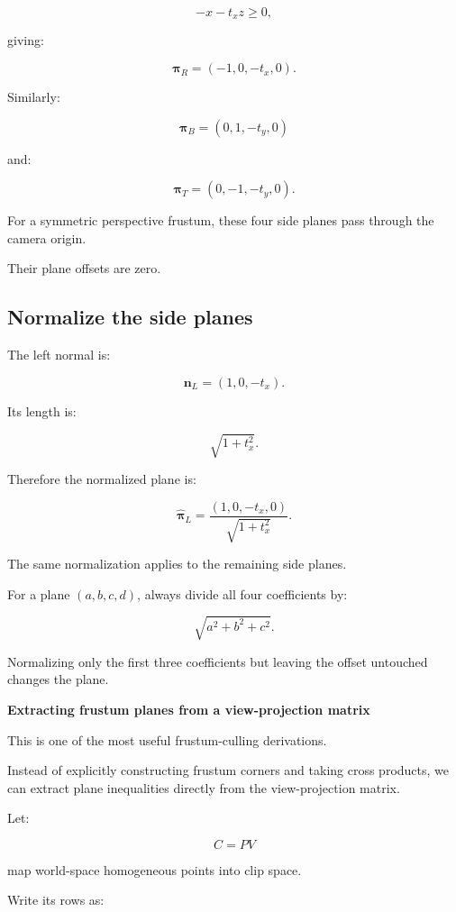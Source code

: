 \[
 \boxed{-x-t_xz\ge0},
\]

giving:

\[
 \boxed{ \boldsymbol\pi_R=(-1,0,-t_x,0) }.
\]

Similarly:

\[
 \boxed{ \boldsymbol\pi_B=(0,1,-t_y,0) }
\]

and:

\[
 \boxed{ \boldsymbol\pi_T=(0,-1,-t_y,0) }.
\]

For a symmetric perspective frustum, these four side planes pass through the camera origin.

Their plane offsets are zero.

\subsection{Normalize the side planes}\label{02-foundations-ii-ch034-normalize-the-side-planes}

\hypertarget{02-foundations-ii-ch034-normalize-the-side-planes}{}

The left normal is:

\[
 \mathbf n_L=(1,0,-t_x).
\]

Its length is:

\[
 \sqrt{1+t_x^2}.
\]

Therefore the normalized plane is:

\[
 \boxed{ \hat{\boldsymbol\pi}_L= \frac{(1,0,-t_x,0)} {\sqrt{1+t_x^2}} }.
\]

The same normalization applies to the remaining side planes.

For a plane \((a,b,c,d)\), always divide all four coefficients by:

\[
 \sqrt{a^2+b^2+c^2}.
\]

Normalizing only the first three coefficients but leaving the offset untouched changes the plane.

\textbf{Extracting frustum planes from a view-projection matrix}

This is one of the most useful frustum-culling derivations.

Instead of explicitly constructing frustum corners and taking cross products, we can extract plane inequalities directly from the view-projection matrix.

Let:

\[
 \boxed{ C=PV }
\]

map world-space homogeneous points into clip space.

Write its rows as:

